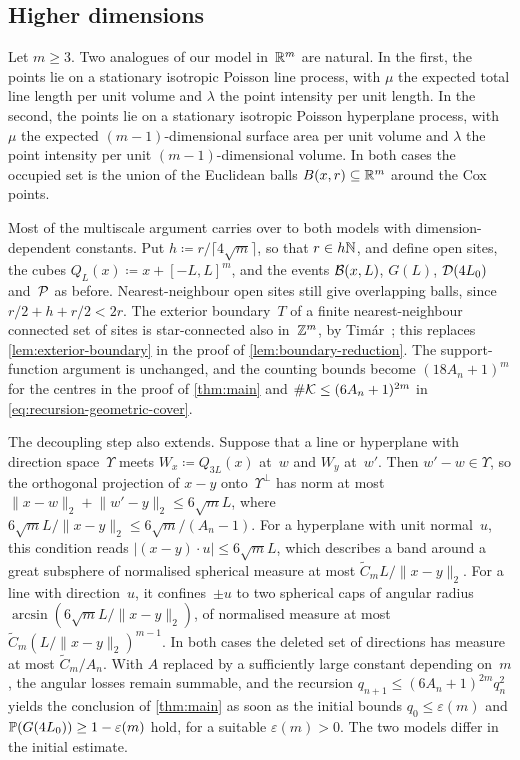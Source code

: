 \documentclass[11pt,letterpaper]{article}
\begin{document}
\subsection{Higher dimensions}
\label{sec:higher-dimensions}

Let $m\ge3$. Two analogues of our model in~$\R^m$ are natural. In the first, the points lie on a stationary isotropic Poisson line process, with $\mu$ the expected total line length per unit volume and $\lambda$ the point intensity per unit length. In the second, the points lie on a stationary isotropic Poisson hyperplane process, with $\mu$ the expected $(m-1)$-dimensional surface area per unit volume and $\lambda$ the point intensity per unit $(m-1)$-dimensional volume. In both cases the occupied set is the union of the Euclidean balls $B(x,r)\subseteq\R^m$ around the Cox points.

Most of the multiscale argument carries over to both models with dimension-dependent constants. Put $h\coloneqq r/\lceil4\sqrt m\rceil$, so that $r\in h\N$, and define open sites, the cubes $Q_L(x)\coloneqq x+[-L,L]^m$, and the events $\cB(x,L)$, $G(L)$, $\cD(4L_0)$ and~$\cP$ as before. Nearest-neighbour open sites still give overlapping balls, since $r/2+h+r/2<2r$. The exterior boundary~$T$ of a finite nearest-neighbour connected set of sites is star-connected also in~$\Z^m$, by Tim\'ar~\cite[Lemma~2]{Tim13}; this replaces \cref{lem:exterior-boundary} in the proof of \cref{lem:boundary-reduction}. The support-function argument is unchanged, and the counting bounds become $(18A_n+1)^m$ for the centres in the proof of \cref{thm:main} and $\#\cK\le(6A_n+1)^{2m}$ in \eqref{eq:recursion-geometric-cover}.

The decoupling step also extends. Suppose that a line or hyperplane with direction space~$\Upsilon$ meets $W_x\coloneqq Q_{3L}(x)$ at~$w$ and $W_y$ at~$w'$. Then $w'-w\in\Upsilon$, so the orthogonal projection of $x-y$ onto~$\Upsilon^\perp$ has norm at most $\lVert x-w\rVert_2+\lVert w'-y\rVert_2\le6\sqrt mL$, where $6\sqrt mL/\lVert x-y\rVert_2\le6\sqrt m/(A_n-1)$. For a hyperplane with unit normal~$u$, this condition reads $\lvert(x-y)\cdot u\rvert\le6\sqrt mL$, which describes a band around a great subsphere of normalised spherical measure at most $\widetilde C_mL/\lVert x-y\rVert_2$. For a line with direction~$u$, it confines~$\pm u$ to two spherical caps of angular radius $\arcsin(6\sqrt mL/\lVert x-y\rVert_2)$, of normalised measure at most $\widetilde C_m(L/\lVert x-y\rVert_2)^{m-1}$. In both cases the deleted set of directions has measure at most $\widetilde C_m/A_n$. With $A$ replaced by a sufficiently large constant depending on~$m$, the angular losses remain summable, and the recursion $q_{n+1}\le(6A_n+1)^{2m}q_n^2$ yields the conclusion of \cref{thm:main} as soon as the initial bounds $q_0\le\varepsilon(m)$ and $\P(G(4L_0))\ge1-\varepsilon(m)$ hold, for a suitable $\varepsilon(m)>0$. The two models differ in the initial estimate.
\end{document}
